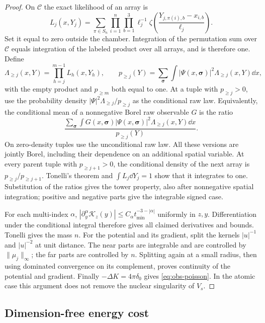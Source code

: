\begin{proof}
On $\mathcal C$ the exact likelihood of an array is
\begin{equation}\label{eq:obs-likelihood}
 L_j(x,Y_j)=\sum_{\pi\in S_n}\prod_{i=1}^n\prod_{b=1}^3
 \ell_j^{-1}\zeta\!\left(
           \frac{Y_{j,\pi(i),b}-x_{i,b}}{\ell_j}\right).
\end{equation}
Set it equal to zero outside the chamber. Integration of the
permutation sum over $\mathcal C$ equals integration of the labeled
product over all arrays, and is therefore one. Define
\[
 \Lambda_{\ge j}(x,Y)=\prod_{h=j}^{m-1}L_h(x,Y_h),\qquad
 p_{\ge j}(Y)=\sum_{\boldsymbol\sigma}\int
       |\Psi(x,\boldsymbol\sigma)|^2\Lambda_{\ge j}(x,Y)\dd x,
\]
with the empty product and $p_{\ge m}$ both equal to one. At a tuple
with $p_{\ge j}>0$, use the probability density
$|\Psi|^2\Lambda_{\ge j}/p_{\ge j}$ as the conditional raw law.
Equivalently, the conditional mean of a nonnegative Borel raw
observable $G$ is the ratio
\[
 \frac{\displaystyle\sum_{\boldsymbol\sigma}\int
       G(x,\boldsymbol\sigma)|\Psi(x,\boldsymbol\sigma)|^2
                      \Lambda_{\ge j}(x,Y)\dd x}
      {p_{\ge j}(Y)}.
\]
On zero-density tuples use the unconditional raw law. All these
versions are jointly Borel, including their dependence on an
additional spatial variable. At every parent tuple with
$p_{\ge j+1}>0$, the conditional density of the next array is
$p_{\ge j}/p_{\ge j+1}$. Tonelli's theorem and $\int L_j\dd Y_j=1$
show that it integrates to one. Substitution of the ratios gives
the tower property, also after nonnegative spatial integration;
positive and negative parts give the integrable signed case.

For each multi-index $\alpha$,
$|\partial_y^\alpha\mathcal K_z(y)|
 \le C_\alpha t_{\min}^{-3-|\alpha|}$ uniformly in $z,y$.
Differentiation under the conditional integral therefore gives all
claimed derivatives and bounds. Tonelli gives the mass $n$.
For the potential and its gradient, split the kernels $|u|^{-1}$
and $|u|^{-2}$ at unit distance. The near parts are integrable and
are controlled by $\|\mu_j\|_\infty$; the far parts are controlled
by $n$. Splitting again at a small radius, then using dominated
convergence on its complement, proves continuity of the potential
and gradient. Finally $-\Delta K=4\pi\delta_0$ gives
\eqref{eq:obs-poisson}. In the atomic case this argument does not
remove the nuclear singularity of $V_s$.
\end{proof}

\subsection{Dimension-free energy cost}

